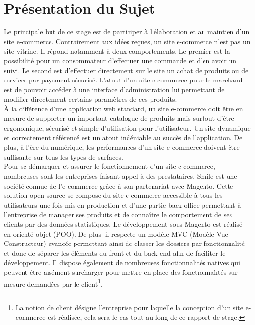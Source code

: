 \documentclass[12pt, a4paper, twoside]{report}
\begin{document}
\section{Présentation du Sujet}

Le principale but de ce stage est de participer à l'élaboration et au maintien d'un site e-commerce. Contrairement aux idées reçues, un site e-commerce n'est pas un site vitrine. Il répond notamment à deux comportements. Le premier est la possibilité pour un consommateur d'effectuer une commande et d'en avoir un suivi. Le second est d'effectuer directement sur le site un achat de produits ou de services par payement sécurisé. L'atout d'un site e-commerce pour le marchand est de pouvoir accéder à une interface d'administration lui permettant de modifier directement certains paramètres de ces produits. \\ 
 
À la différence d'une application web standard, un site e-commerce doit être en mesure de supporter un important catalogue de produits mais surtout d'être ergonomique, sécurisé et simple d'utilisation pour l'utilisateur. Un site dynamique et correctement référencé est un atout indéniable au succès de l'application. De plus, à l'ère du numérique, les performances d'un site e-commerce doivent être suffisante sur tous les types de surfaces. \\

Pour se démarquer et assurer le fonctionnement d'un site e-commerce, nombreuses sont les entreprises faisant appel à des prestataires. Smile est une société connue de l'e-commerce grâce à son partenariat avec Magento. Cette solution open-source se compose du site e-commerce accessible à tous les utilisateurs une fois mis en production et d'une partie back office permettant à l'entreprise de manager ses produits et de connaître le comportement de ses clients par des données statistiques. Le développement sous Magento est réalisé en orienté objet (POO). De plus, il respecte un modèle MVC (Modèle Vue Constructeur) avancée permettant ainsi de classer les dossiers par fonctionnalité et donc de séparer les éléments du front et du back end afin de faciliter le développement. Il dispose également de nombreuses fonctionnalités natives qui peuvent être aisément surcharger pour mettre en place des fonctionnalités sur-mesure demandées par le client\footnote{La notion de client désigne l'entreprise pour laquelle la conception d'un site e-commerce est réalisée, cela sera le cas tout au long de ce rapport de stage.}.
\end{document}

